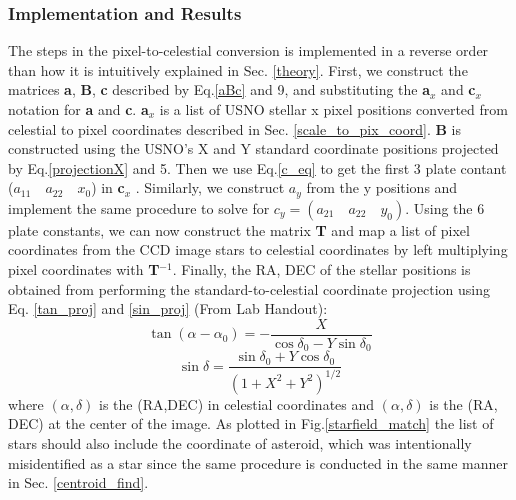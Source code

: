 \documentclass[authoryear, 12pt,5p, times]{elsarticle}
\begin{document}
	\subsubsection{Implementation and Results}
	The steps in the pixel-to-celestial conversion is implemented in a reverse order than how it is intuitively explained in Sec. \ref{theory}. First, we construct the matrices \textbf{a}, \textbf{B}, \textbf{c} described by Eq.\ref{aBc} and 9, and substituting the \textbf{a}$_x$ and \textbf{c}$_x$ notation for \textbf{a} and \textbf{c}. \textbf{a}$_x$ is a list of USNO stellar x pixel positions converted from celestial to pixel coordinates described in Sec. \ref{scale_to_pix_coord}.  \textbf{B} is constructed using the USNO's X and Y standard coordinate positions projected by Eq.\ref{projectionX} and 5. Then we use Eq.\ref{c_eq}
to get the first 3 plate contant ($a_{11}\quad a_{22}\quad x_0$) in \textbf{c}$_x$	. Similarly, we construct $a_y$ from the y positions and implement the same procedure to solve for $c_y=(a_{21} \quad a_{22}\quad y_0)$.
Using the 6 plate constants, we can now construct the matrix \textbf{T} and map a list of pixel coordinates from the CCD image stars to celestial coordinates by left multiplying pixel coordinates with \textbf{T}$^{-1}$. Finally, the RA, DEC of the stellar positions is obtained from performing the standard-to-celestial coordinate projection using Eq. \ref{tan_proj} and \ref{sin_proj} (From Lab Handout):
\begin{equation}
\tan(\alpha-\alpha_0)=-\frac{X}{\cos\delta_0-Y\sin\delta_0}
\label{tan_proj}
\end{equation}
\begin{equation}
\sin \delta= \frac{\sin \delta_0+Y\cos\delta_0}{(1+X^2+Y^2)^{1/2}}
\label{sin_proj}
\end{equation}
where $(\alpha,\delta)$ is the (RA,DEC) in celestial coordinates and $(\alpha,\delta)$ is the (RA, DEC) at the center of the image.
 As plotted in Fig.\ref{starfield_match} the list of stars should also include the coordinate of asteroid, which was intentionally misidentified as a star since the same procedure is conducted in the same manner in Sec. \ref{centroid_find}. 
\end{document}
